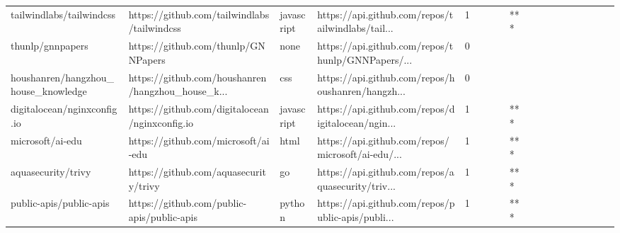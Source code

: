 \begin{tabular}{llllrlllllllllllll}
tailwindlabs/tailwindcss                           &        https://github.com/tailwindlabs/tailwindcss &        javascript &  https://api.github.com/repos/tailwindlabs/tail... &       1 &         &        &           &            *** &                 &        &           &           &          &          &       &              &          \\
thunlp/gnnpapers                                   &                https://github.com/thunlp/GNNPapers &              none &  https://api.github.com/repos/thunlp/GNNPapers/... &       0 &         &        &           &                &                 &        &           &           &          &          &       &              &          \\
houshanren/hangzhou\_house\_knowledge                &  https://github.com/houshanren/hangzhou\_house\_k... &               css &  https://api.github.com/repos/houshanren/hangzh... &       0 &         &        &           &                &                 &        &           &           &          &          &       &              &          \\
digitalocean/nginxconfig.io                        &     https://github.com/digitalocean/nginxconfig.io &        javascript &  https://api.github.com/repos/digitalocean/ngin... &       1 &         &        &           &            *** &                 &        &           &           &          &          &       &              &          \\
microsoft/ai-edu                                   &                https://github.com/microsoft/ai-edu &              html &  https://api.github.com/repos/microsoft/ai-edu/... &       1 &         &        &           &            *** &                 &        &           &           &          &          &       &              &          \\
aquasecurity/trivy                                 &              https://github.com/aquasecurity/trivy &                go &  https://api.github.com/repos/aquasecurity/triv... &       1 &         &        &           &            *** &                 &        &           &           &          &          &       &              &          \\
public-apis/public-apis                            &         https://github.com/public-apis/public-apis &            python &  https://api.github.com/repos/public-apis/publi... &       1 &         &        &           &            *** &                 &        &           &           &          &          &       &              &          \\

\end{tabular}

